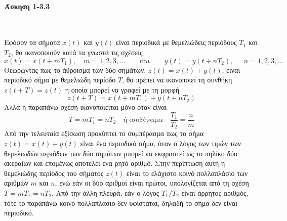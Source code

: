 \documentclass[a4paper,twoside,10pt,openany]{memoir}
\theoremstyle{dotless}
\newcounter{problem}[section] %
\begin{document}
\pagestyle{empty}


\paragraph {Άσκηση 1-3.3}~\medskip


\begin{solution}
Εφόσον τα σήματα $x(t)$ και $y(t)$ είναι περιοδικά με θεμελιώδεις περιόδους $T_1$ και $T_2$, θα ικανοποιούν κατά τα γνωστά τις σχέσεις
\begin{equation*}
x(t)=x(t+mT_1),\quad m=1,2,3,\dots\qquad\mbox{και}\qquad
y(t)=y(t+nT_2),\quad\:\: n=1,2,3,\dots
\end{equation*}
Θεωρώντας πως το άθροισμα των δύο σημάτων, $z(t)=x(t)+y(t)$, είναι περιοδικό σήμα με θεμελιώδη περίοδο $T$, θα πρέπει να ικανοποιεί τη συνθήκη $z(t+T)=z(t)$ η οποία μπορεί να γραφεί με τη μορφή
\begin{equation*}
z(t+T)=x(t+mT_1)+y(t+nT_2)
\end{equation*}
Αλλά η παραπάνω σχέση ικανοποιείται μόνο όταν είναι
\begin{equation*}
T=mT_1=nT_2\quad\mbox{ή ισοδύναμα}\quad\frac{T_1}{T_2}=\frac{n}{m}
\end{equation*}
Από την τελευταία εξίσωση προκύπτει το συμπέρασμα πως το σήμα $z(t)=x(t)+y(t)$ είναι ένα περιοδικό σήμα, όταν ο λόγος των τιμών των θεμελιωδών περιόδων των δύο σημάτων μπορεί να εκφραστεί ως το πηλίκο δύο ακεραίων και επομένως αποτελεί ένα ρητό αριθμό. Στην περίπτωση αυτή η θεμελιώδης περίοδος του σήματος $z(t)$ είναι το ελάχιστο κοινό πολλαπλάσιο των αριθμών $m$ και $n$, ενώ εάν οι δύο αριθμοί είναι πρώτοι, υπολογίζεται από τη σχέση $T=mT_1=nT_2$. Από την άλλη πλευρά, εάν ο λόγος $T_1/T_2$ είναι άρρητος αριθμός, τότε το παραπάνω κοινό πολλαπλάσιο δεν υφίσταται, δηλαδή το σήμα δεν είναι περιοδικό.
\end{solution}
\end{document}
